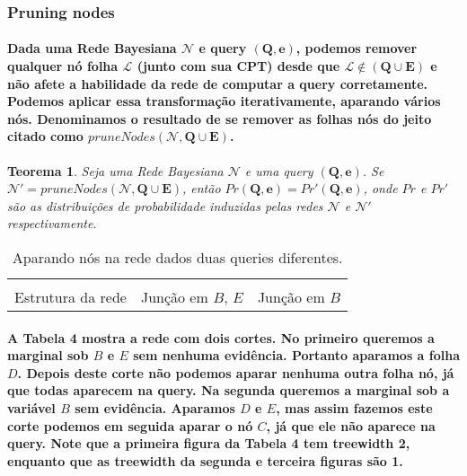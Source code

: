 \documentclass[a4paper,10pt]{article}
\theoremstyle{plain}
\newtheorem*{spn-thm}{Teorema}
\begin{document}
\subsubsection{Pruning nodes}

\paragraph{
  Dada uma Rede Bayesiana $\mathcal{N}$ e query $(\textbf{Q}, \textbf{e})$, podemos remover 
  qualquer nó folha $\mathcal{L}$ (junto com sua CPT) desde que $\mathcal{L} \notin (\mathbf{Q} 
  \cup \mathbf{E})$ e não afete a habilidade da rede de computar a query corretamente. Podemos 
  aplicar essa transformação iterativamente, aparando vários nós. Denominamos o resultado de se 
  remover as folhas nós do jeito citado como $pruneNodes(\mathcal{N}, \mathbf{Q} \cup \mathbf{E})$.
}

\begin{spn-thm} Seja uma Rede Bayesiana $\mathcal{N}$ e uma query $(\mathbf{Q}, \mathbf{e})$. Se
  $\mathcal{N}' = pruneNodes(\mathcal{N}, \mathbf{Q} \cup \mathbf{E})$, então $Pr(\mathbf{Q},
  \mathbf{e}) = Pr'(\mathbf{Q}, \mathbf{e})$, onde $Pr$ e $Pr'$ são as distribuições de 
  probabilidade induzidas pelas redes $\mathcal{N}$ e $\mathcal{N}'$ respectivamente.
\end{spn-thm}

\begin{table}[h]
  \begin{center}
    \captionsetup{justification=centering}
    \begin{tabular}{c c c}
       &  &  \\
      Estrutura da rede & Junção em $B$, $E$ & Junção em $B$ \\
    \end{tabular}
    \caption{Aparando nós na rede dados duas queries diferentes.}
  \end{center}
\end{table}

\paragraph{
  A Tabela 4 mostra a rede com dois cortes. No primeiro queremos a marginal sob $B$ e $E$ sem 
  nenhuma evidência. Portanto aparamos a folha $D$. Depois deste corte não podemos aparar nenhuma
  outra folha nó, já que todas aparecem na query. Na segunda queremos a marginal sob a variável $B$
  sem evidência. Aparamos $D$ e $E$, mas assim fazemos este corte podemos em seguida aparar o nó
  $C$, já que ele não aparece na query. Note que a primeira figura da Tabela 4 tem treewidth 2, 
  enquanto que as treewidth da segunda e terceira figuras são 1.
}
\end{document}
